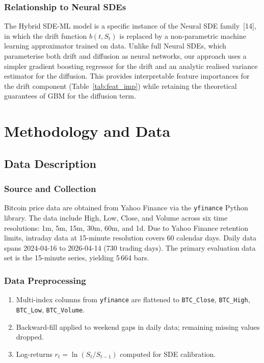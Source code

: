 \documentclass[12pt, a4paper, oneside]{report}
\theoremstyle{plain}
\theoremstyle{definition}
\theoremstyle{remark}
\begin{document}
\subsection{Relationship to Neural SDEs}

The Hybrid SDE-ML model is a specific instance of the Neural SDE family~[14],
in which the drift function $b(t, S_t)$ is replaced by a non-parametric
machine learning approximator trained on data.  Unlike full Neural SDEs, which
parameterise both drift and diffusion as neural networks, our approach uses a
simpler gradient boosting regressor for the drift and an analytic realised
variance estimator for the diffusion.  This provides interpretable feature
importances for the drift component (Table~\ref{tab:feat_imp}) while
retaining the theoretical guarantees of GBM for the diffusion term.

\chapter{Methodology and Data}
\label{ch:methodology}

\section{Data Description}

\subsection{Source and Collection}

Bitcoin price data are obtained from Yahoo Finance via the \texttt{yfinance}
Python library.  The data include High, Low, Close, and Volume across six time
resolutions: 1m, 5m, 15m, 30m, 60m, and 1d.  Due to Yahoo Finance retention
limits, intraday data at 15-minute resolution covers 60 calendar days.  Daily
data spans 2024-04-16 to 2026-04-14 (730 trading days).  The primary
evaluation data set is the 15-minute series, yielding 5\,664 bars.

\subsection{Data Preprocessing}

\begin{enumerate}[leftmargin=1.25cm, label=\arabic*.]
  \item Multi-index columns from \texttt{yfinance} are flattened to
    \texttt{BTC\_Close}, \texttt{BTC\_High}, \texttt{BTC\_Low},
    \texttt{BTC\_Volume}.
  \item Backward-fill applied to weekend gaps in daily data; remaining
    missing values dropped.
  \item Log-returns $r_t = \ln(S_t/S_{t-1})$ computed for SDE calibration.
\end{enumerate}
\end{document}

